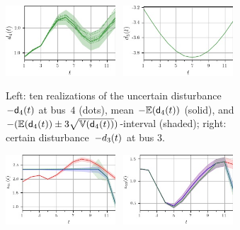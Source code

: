 \documentclass[final,3p,times,twocolumn]{elsarticle}  %
\begin{document}
\begin{figure}
	\centering
	\vspace{3cm}
	
	\begin{subfigure}[c]{\figwidth}
		\centering
		\includegraphics[width=0.45\textwidth]{figures/time series/case39_volatile/uncertain_disturbance_4.jpg}~
		\includegraphics[width=0.45\textwidth]{figures/time series/case39_volatile/certain_disturbance_3.jpg}%
		
		\vspace{-2mm}		
		\caption{Left: ten realizations of the uncertain disturbance~$-\mathsf{d}_4(t)$ at bus~$4$ (dots), mean $-\mathbb{E}(\mathsf{d}_4(t))$ (solid), and $-(\mathbb{E}(\mathsf{d}_4(t)) \pm 3\sqrt{\mathbb{V}(\mathsf{d}_4(t))})$-interval (shaded); right: certain disturbance~$-d_{3}(t)$ at bus $3$.}
		\label{fig:Disturbances}
	\end{subfigure}
	
	\begin{subfigure}[c]{\figwidth}
		\centering
        \includegraphics[width=0.45\textwidth]{figures/time series/case39_volatile/gen_u_8102.jpg}~
        \includegraphics[width=0.45\textwidth]{figures/time series/case39_volatile/gen_u_8104.jpg}%
		

\end{subfigure}
\end{figure}
\end{document}
